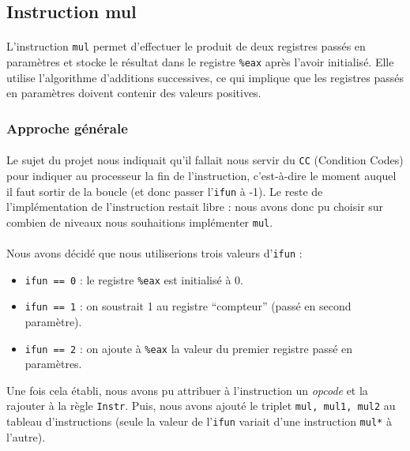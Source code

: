 \documentclass[12pt]{article}
\begin{document}
\subsection{Instruction mul}
\paragraph{}L'instruction \verb+mul+ permet d'effectuer le produit de deux registres passés en paramètres et stocke le résultat dans le registre \verb+%eax+ après l'avoir initialisé. Elle utilise l'algorithme d'additions successives, ce qui implique que les registres passés en paramètres doivent contenir des valeurs positives.  

\subsubsection{Approche générale}
\paragraph{}Le sujet du projet nous indiquait qu'il fallait nous servir du \verb+CC+ (Condition Codes) pour indiquer au processeur la fin de l'instruction, c'est-à-dire le moment auquel il faut sortir de la boucle (et donc passer l'\verb+ifun+ à -1). Le reste de l'implémentation de l'instruction restait libre : nous avons donc pu choisir sur combien de niveaux nous souhaitions implémenter \verb+mul+.

\paragraph{}Nous avons décidé que nous utiliserions trois valeurs d'\verb+ifun+ :
\begin{itemize}
\item \verb+ifun == 0+ : le registre \verb+%eax+ est initialisé à 0.
\item \verb+ifun == 1+ : on soustrait 1 au registre ``compteur'' (passé en second paramètre).
\item \verb+ifun == 2+ : on ajoute à \verb+%eax+ la valeur du premier registre passé en paramètres.
\end{itemize}
Une fois cela établi, nous avons pu attribuer à l'instruction un {\itshape opcode} et la rajouter à la règle \verb+Instr+. Puis, nous avons ajouté le triplet \verb+mul, mul1, mul2+ au tableau d'instructions (seule la valeur de l'\verb+ifun+ variait d'une instruction \verb+mul*+ à l'autre).
\end{document}
